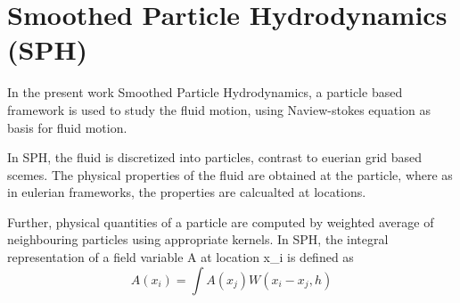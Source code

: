 \chapter{Smoothed Particle Hydrodynamics (SPH)}
\label{chap:SPH}

In the present work Smoothed Particle Hydrodynamics, a particle based
framework is used to study the fluid motion, using Naview-stokes
equation as basis for fluid motion.

In SPH, the fluid is discretized into particles, contrast to euerian
grid based scemes. The physical properties of the fluid are obtained
at the particle, where as in eulerian frameworks, the properties are
calcualted at locations.

Further, physical quantities of a particle are computed by weighted
average of neighbouring particles using appropriate kernels. In SPH,
the integral representation of a field variable A at location x_i is
defined as
\begin{equation}
  \label{eq:integral_rep}
  A(x_i) = \int A(x_j) W(x_i - x_j, h)
\end{equation}